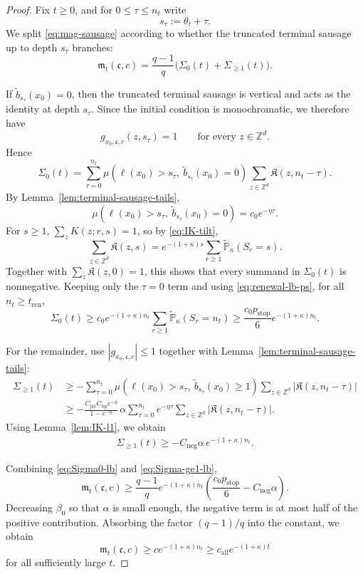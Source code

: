 \documentclass[letterpaper,11pt,reqno]{amsart}
\theoremstyle{definition}
\newcommand{\IK}{\mathfrak{K}}
\begin{document}
\begin{proof}
Fix \(t\ge0\), and for \(0\le \tau\le n_t\) write
\[
s_\tau:=\theta_t+\tau.
\]
We split \eqref{eq:mag-sausage} according to whether the truncated terminal sausage up to depth
\(s_\tau\) branches:
\[
\mathfrak m_t(\mathfrak c,c)
=
\frac{q-1}{q}\bigl(\Sigma_0(t)+\Sigma_{\ge1}(t)\bigr).
\]

If \(\tilde b_{s_\tau}(x_0)=0\), then the truncated terminal sausage is vertical and acts as the
identity at depth \(s_\tau\). Since the initial condition is monochromatic, we therefore have
\[
g_{x_0,\mathfrak c,c}(z,s_\tau)=1
\qquad\text{for every }z\in\mathbb Z^d.
\]
Hence
\[
\Sigma_0(t)
=
\sum_{\tau=0}^{n_t}\mu(\ell(x_0)> s_\tau,\ \tilde b_{s_\tau}(x_0)=0)\sum_{z\in\mathbb Z^d}\IK(z,n_t-\tau).
\]
By Lemma~\ref{lem:terminal-sausage-tails},
\[
\mu(\ell(x_0)> s_\tau,\ \tilde b_{s_\tau}(x_0)=0)=c_0e^{-\eta\tau}.
\]
For \(s\ge1\), \(\sum_z K(z;r,s)=1\), so by \eqref{eq:IK-tilt},
\[
\sum_{z\in\mathbb Z^d}\IK(z,s)
=
e^{-(1+\kappa)s}\sum_{r\ge1}\tilde{\mathbb P}_\kappa(S_r=s).
\]
Together with \(\sum_z\IK(z,0)=1\), this shows that every summand in
\(\Sigma_0(t)\) is nonnegative. Keeping only the \(\tau=0\) term and using
\eqref{eq:renewal-lb-ps}, for all \(n_t\ge t_{\mathrm{ren}}\),
\begin{equation}\label{eq:Sigma0-lb}
\Sigma_0(t)\ge c_0e^{-(1+\kappa)n_t}
\sum_{r\ge1}\tilde{\mathbb P}_\kappa(S_r=n_t)
\ge \frac{c_0p_{\mathrm{stop}}}{6}e^{-(1+\kappa)n_t}.
\end{equation}

For the remainder, use \(|g_{x_0,\mathfrak c,c}|\le1\) together with
Lemma~\ref{lem:terminal-sausage-tails}:
\begin{align*}
\Sigma_{\ge1}(t)
&\ge
-
\sum_{\tau=0}^{n_t}\mu(\ell(x_0)> s_\tau,\ \tilde b_{s_\tau}(x_0)\ge1)
\sum_{z\in\mathbb Z^d}|\IK(z,n_t-\tau)| \\
&\ge
-
\frac{C_{\mathrm{jnt}}C_{\mathrm{bp}}e^{-\eta}}{1-e^{-\eta}}\,
\alpha\sum_{\tau=0}^{n_t}e^{-\eta\tau}\sum_{z\in\mathbb Z^d}|\IK(z,n_t-\tau)|.
\end{align*}
Using Lemma~\ref{lem:IK-l1}, we obtain
\begin{align}\label{eq:Sigma-ge1-lb}
\Sigma_{\ge1}(t)
\ge
-
C_{\mathrm{neg}}\alpha\,e^{-(1+\kappa)n_t}.
\end{align}

Combining \eqref{eq:Sigma0-lb} and \eqref{eq:Sigma-ge1-lb},
\[
\mathfrak m_t(\mathfrak c,c)
\ge
\frac{q-1}{q}
e^{-(1+\kappa)n_t}
\left(\frac{c_0p_{\mathrm{stop}}}{6}-C_{\mathrm{neg}}\alpha\right).
\]
Decreasing \(\beta_0\) so that
\(\alpha\) is small enough, the negative term is at most half of the positive contribution.
Absorbing the factor \((q-1)/q\) into the constant, we obtain
\[
    \mathfrak m_t(\mathfrak c,c)
    \ge c e^{-(1+\kappa)n_t}
    \ge c_{\mathrm{all}}e^{-(1+\kappa)t}
\]
for all sufficiently large \(t\).
\end{proof}
\end{document}
